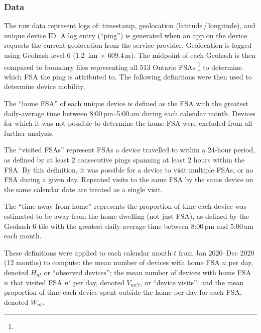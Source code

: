 \subsubsection{Data}\label{app.mob.data}
The raw data represent logs of: timestamp, geolocation (latitude\,/\,longitude), and unique device ID.
A log entry (``ping'') is generated when an app on the device
requests the current geolocation from the service provider.
Geolocation is logged using Geohash level 6 (1.2 \,km $\times$ 609.4\,m).
The midpoint of each Geohash is then compared to boundary files representing all 513 Ontario FSAs%
\footnote{}
to determine which FSA the ping is attributed to.
The following definitions were then used to determine device mobility.
\par
The ``home FSA'' of each unique device is defined as
the FSA with the greatest daily-average time between 8:00\,pm--5:00\,am during each calendar month.
Devices for which it was not possible to determine the home FSA were excluded from all further analysis.
\par
The ``visited FSAs'' represent FSAs a device travelled to within a 24-hour period,
as defined by at least 2 consecutive pings spanning at least 2 hours within the FSA.
By this definition, it was possible for a device to visit multiple FSAs, or no FSA during a given day.
Repeated visits to the same FSA by the same device on the same calendar date are treated as a single visit.
\par
The ``time away from home'' represents the proportion of time each device
was estimated to be away from the home dwelling (not just FSA),
as defined by the Geohash 6 tile with the greatest daily-average time between 8:00\,pm and 5:00\,am each month.
\par
These definitions were applied to each calendar month $t$ from Jan 2020--Dec 2020 (12 months) to compute:
the mean number of devices with home FSA $n$ per day, denoted $H_{nt}$ or ``observed devices'';
the mean number of devices with home FSA $n$ that visited FSA $n'$ per day, denoted $V_{nn't}$, or ``device visits''; and
the mean proportion of time each device spent outside the home per day for each FSA, denoted $W_{nt}$.
